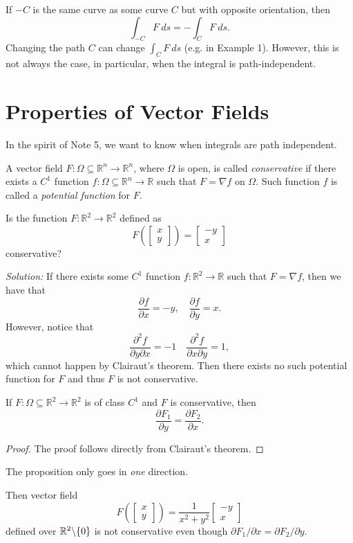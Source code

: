 \documentclass[11pt]{article}
\theoremstyle{definition}
\newcommand{\R}{\mathbb{R}}                      %
\newcommand{\bslash}{\symbol{92}}
\newcommand{\mat}{\begin{bmatrix}}
\newcommand{\trix}{\end{bmatrix}}
\newcommand{\dell}{\partial}
\begin{document}
\note If $-C$ is the same curve as some curve $C$ but with opposite orientation, then
$$
\int_{-C} F~ds = -\int_C F~ds.
$$
\note Changing the path $C$ can change $\int_C F~ds$ (e.g. in Example 1). However, this is not always the case, in particular, when the integral is path-independent. 
\section{Properties of Vector Fields}

In the spirit of Note 5, we want to know when integrals are path independent.
\begin{mdframed}[backgroundcolor = blue!10]
\vspace{+0.1cm}

 A vector field $F:\Omega\subseteq \R^n\to\R^n$, where $\Omega$ is open, is called \textit{conservative} if there exists a $C^1$ function $f:\Omega\subseteq \R^n\to \R$ such that $F=\nabla f$ on $\Omega$. Such  function $f$ is called a \textit{potential function} for $F$.

\end{mdframed}

\ex Is the function $F:\R^2\to \R^2$ defined as
$$
F\left(\mat x\\y \trix\right) = \mat -y \\ x \trix 
$$
conservative?

\textit{Solution:} If there exists some $C^1$ function $f:\R^2\to \R$ such that $F=\nabla f$, then we have that
$$
\frac{\dell f}{\dell x}=-y,\quad \frac{\dell f}{\dell y}=x.
$$
However, notice that 
$$
\frac{\dell^2 f}{\dell y\dell x}=-1 \quad \frac{\dell^2 f}{\dell x \dell y} = 1,
$$
which cannot happen by Clairaut's theorem. Then there exists no such potential function for $F$ and thus $F$ is not conservative.

\prop If $F:\Omega\subseteq \R^2\to \R^2$ is of class $C^1$ and $F$ is conservative, then
$$
\frac{\dell F_1}{\dell y}=\frac{\dell F_2}{\dell x}.
$$
\begin{proof}
    The proof follows directly from Clairaut's theorem.
\end{proof}

\note The proposition only goes in \textit{one} direction.

\ex Then vector field
$$
F\left(\mat x \\ y \trix\right)=\frac{1}{x^2+y^2}\mat -y \\ x \trix 
$$
defined over $\R^2\bslash\{0\}$ is not conservative even though $\dell F_1/\dell x = \dell F_2/\dell y$.
\end{document}
